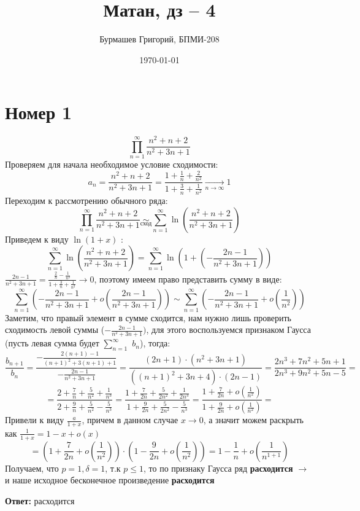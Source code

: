 \documentclass[a4paper,12pt]{article}
\author{Бурмашев Григорий, БПМИ-208}
\title{Матан, дз -- 4}
\date{\today}
\begin{document}
\maketitle
\clearpage
\section*{Номер 1}
\[
\prod_{n = 1}^{\infty} \frac{n^2 + n + 2}{n^2 + 3n +1 }
\]
Проверяем для начала необходимое условие сходимости:
\[
a_n = \frac{n^2 + n + 2}{n^2 + 3n + 1} = \frac{1 + \frac1n + \frac{2}{n^2}}{1 + \frac3n + \frac{1}{n^2}} \underset{n \rightarrow \infty}{\longrightarrow} 1
\]
Переходим к рассмотрению обычного ряда:
\[
\prod_{n = 1}^{\infty} \frac{n^2 + n + 2}{n^2 + 3n +1 } \underset{\text{сход}}{\sim} \sum_{n = 1}^{\infty} \ln \left(\frac{n^2 + n + 2}{n^2 + 3n +1 } \right)
\]
Приведем к виду $\ln( 1 + x)$ :
\[
\sum_{n = 1}^{\infty} \ln \left(\frac{n^2 + n + 2}{n^2 + 3n +1 } \right) = \sum_{n = 1}^{\infty} \ln \left(1 + \left(-\frac{2n-1}{n^2 + 3n + 1}\right)\right)
\]
$\frac{2n -1 }{n^2 + 3n + 1} = \frac{\frac{2}{n} - \frac{1}{n^2}}{1 + \frac{3}{n} + \frac{1}{n^2}} \rightarrow 0$, поэтому имеем право представить сумму в виде:
\[
\sum_{n = 1}^{\infty} \left( - \frac{2n - 1}{n^2 + 3n + 1} + o \left( \frac{2n-1}{n^2 + 3n + 1}\right) \right) \sim \sum_{n = 1}^{\infty} \left( - \frac{2n - 1}{n^2 + 3n + 1} + o \left( \frac{1}{n^2}\right) \right)
\]
Заметим, что правый элемент в сумме сходится, нам нужно лишь проверить сходимость левой суммы ($-\frac{2n-1}{n^2+3n+1})$, для этого воспользуемся признаком Гаусса (пусть  левая сумма будет $\sum\limits_{n=1}^{\infty}$ $b_n$), тогда:
\[
\frac{b_{n+1}}{b_n} = \frac{-\frac{2(n+1)-1}{(n+1)^2+3(n+1)+1}}{-\frac{2n-1}{n^2+3n+1}} = \frac{(2n +1) \cdot (n^2 +3n + 1)}{\left((n+1)^2 + 3n + 4\right)\cdot (2n - 1)} = \frac{2n^3 + 7n^2 + 5n + 1}{2n^3 + 9n^2 +5n - 5} =
\] 
\[
= \frac{2 + \frac7n +\frac{5}{n^2} + \frac{1}{n^3}}{2 + \frac9n + \frac{5}{n^2} -\frac{5}{n^3}} = \frac{1 + \frac{7}{2n} + \frac{5}{2n^2} + \frac{1}{2n^3}}{1 + \frac{9}{2n} + \frac{5}{2n^2} - \frac{5}{n^3}} = \frac{1 + \frac{7}{2n} + o(\frac{1}{n^2})}{1+\frac{9}{2n} + o(\frac{1}{n^2})} = 
\]
Привели к виду $\frac{a}{1 + x}$,  причем в данном случае $x \rightarrow 0$, а значит можем раскрыть как $\frac{1}{1 + x} = 1 - x + o\left(x\right)$ 
\[
= \left(1 + \frac{7}{2n} + o\left(\frac{1}{n^2}\right) \right) \cdot \left( 1 - \frac{9}{2n} + o\left(\frac{1}{n^2}\right) \right) = 1- \frac1n + o\left(\frac{1}{n^{1 + 1}}\right)
\]
Получаем, что $p = 1, \delta = 1$, т.к $p \leq 1$, то по признаку Гаусса ряд \textbf{расходится} $\rightarrow$ и наше исходное бесконечное произведение \textbf{расходится}
\begin{center}
\textbf{Ответ: } расходится
\end{center}
\clearpage
\end{document}
